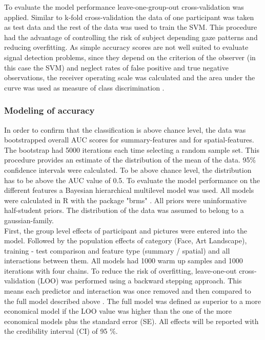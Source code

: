 \documentclass[a4paper,man,natbib,floatsintext]{apa6}
\begin{document}
To evaluate the model performance leave-one-group-out cross-validation was applied. Similar to k-fold cross-validation the data of one participant was taken as test data and the rest of the data was used to train the SVM. This procedure had the advantage of controlling the risk of subject depending gaze patterns and reducing overfitting. As simple accuracy scores are not well suited to evaluate signal detection problems, since they depend on the criterion of the observer (in this case the SVM)  and neglect rates of false positive and true negative observations, the receiver operating scale was calculated and the area under the curve was used as measure of class discrimination \citep{Hsu2010}.\\ 

\subsubsection{Modeling of accuracy}
In order to confirm that the classification is above chance level, the data was bootstrapped overall AUC scores for summary-features and for spatial-features. The bootstrap had 5000 iterations each time selecting a random sample set. This procedure provides an estimate of the distribution of the mean of the data. 95\% confidence intervals were calculated. To be above chance level, the distribution has to be above the AUC value of 0.5.
To evaluate the model performance on the different features a Bayesian hierarchical multilevel model was used.  All models were calculated in R \citep{RDevelopmentCoreTeam2016} with the package "brms" \citep{buerkner2016brms}. All priors were uninformative half-student priors. The distribution of the data was assumed to belong to a gaussian-family.\\
First, the group level effects of participant and pictures were entered into the model. Followed by the population effects of category (Face, Art Landscape), training - test comparison and feature type (summary / spatial) and all interactions between them. All models had 1000 warm up samples and 1000 iterations with four chains. 
To reduce the risk of overfitting, leave-one-out cross-validation (LOO) was performed using a backward stepping approach. This means each predictor and interaction was once removed and then compared to the full model described above \citep{Vehtari2016}. The full model was defined as superior to a more economical model if the LOO value was higher than the one of the more economical models plus the standard error (SE). All effects will be reported with the credibility interval (CI) of 95 \%. 
\end{document}
